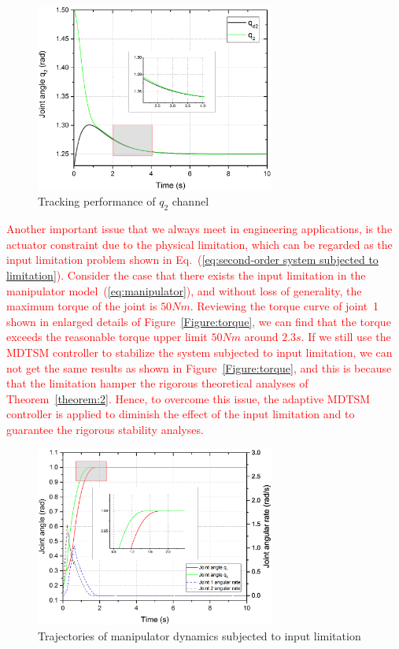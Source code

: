 \documentclass[3p]{elsarticle}
\theoremstyle{plain}
\theoremstyle{remark}
\begin{document}
\begin{figure}[http]
\centering
\includegraphics[width=0.7\textwidth]{paper3_fig7.eps}
\caption{Tracking performance of $q_2$ channel}
\label{Figure:7}
\end{figure}
\textcolor{red}{Another important issue that we always meet in engineering applications, is the actuator constraint due to the physical limitation, which can be regarded as the input limitation problem shown in Eq.~(\ref{eq:second-order system subjected to limitation}). Consider the case that there exists the input limitation in the manipulator model~(\ref{eq:manipulator}), and without loss of generality, the maximum torque of the joint is $50Nm$. Reviewing the torque curve of joint~1  shown in enlarged details of  Figure~\ref{Figure:torque}, we can find that the torque exceeds the reasonable torque upper limit $50Nm$ around $2.3s$. If we still use the MDTSM controller to stabilize the system subjected to input limitation, we can not get the same results as shown in Figure~\ref{Figure:torque}, and this is because that the limitation hamper the rigorous theoretical analyses of Theorem~\ref{theorem:2}. Hence, to overcome this issue, the adaptive MDTSM controller is applied to diminish the effect of the input limitation and to guarantee the rigorous stability analyses.}
\begin{figure}
\centering
\includegraphics[width=0.7\textwidth]{paper3_fig_limitation_q.eps}
\caption{Trajectories of manipulator dynamics subjected to input limitation}
\label{Figure:limitation_q}
\end{figure}
\end{document}
